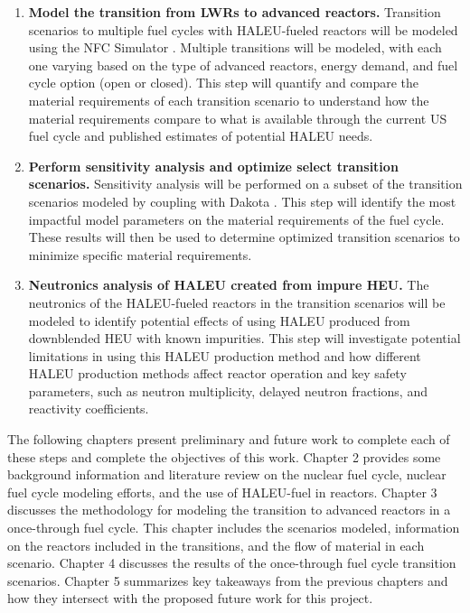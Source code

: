 \begin{enumerate}
\item \textbf{Model the transition from \glspl{LWR} to advanced reactors.} 
Transition scenarios to multiple fuel cycles with \gls{HALEU}-fueled 
reactors will 
be modeled using the \gls{NFC} Simulator \Cyclus \cite{huff_fundamental_2016}. 
Multiple transitions will be modeled, with each one varying based on the type
of  
advanced reactors, energy demand, and fuel cycle option (open or closed). This 
step will quantify and compare the material requirements of each transition 
scenario to understand how the material requirements compare to what is available 
through the current US fuel cycle and published estimates of potential 
\gls{HALEU} needs. 

\item \textbf{Perform sensitivity analysis and optimize select transition scenarios.}
Sensitivity analysis will be performed on a subset of the transition scenarios
modeled by coupling \Cyclus with Dakota \cite{adams_dakota_2019}. This step 
will identify the most impactful model parameters on 
the material requirements of the fuel cycle. These results will then be 
used to determine optimized transition scenarios to minimize specific 
material requirements. 

\item \textbf{Neutronics analysis of \gls{HALEU} created from impure \gls{HEU}.}
The neutronics of the \gls{HALEU}-fueled reactors in the transition scenarios 
will be modeled to identify potential effects of using \gls{HALEU} produced 
from downblended \gls{HEU} with known impurities. This step will investigate 
potential limitations in using this \gls{HALEU} production method and 
how different \gls{HALEU} production methods affect reactor operation and 
key safety parameters, such as neutron multiplicity, delayed neutron 
fractions, and reactivity coefficients.
\end{enumerate}


The following chapters present preliminary and future work to complete 
each of these steps and complete the objectives of this work. Chapter 2 
provides some 
background information and literature review on the nuclear fuel cycle,
nuclear fuel cycle 
modeling efforts, and the use of \gls{HALEU}-fuel in reactors.
Chapter 3 discusses the methodology for modeling the transition to advanced 
reactors in a once-through fuel cycle. This chapter includes the scenarios
modeled, information on the reactors included in the transitions, and the 
flow of 
material in each scenario. Chapter 4 discusses the results of the 
once-through fuel cycle transition scenarios. Chapter 5 summarizes key 
takeaways from the previous chapters and how they intersect with the 
proposed future work for this project. 